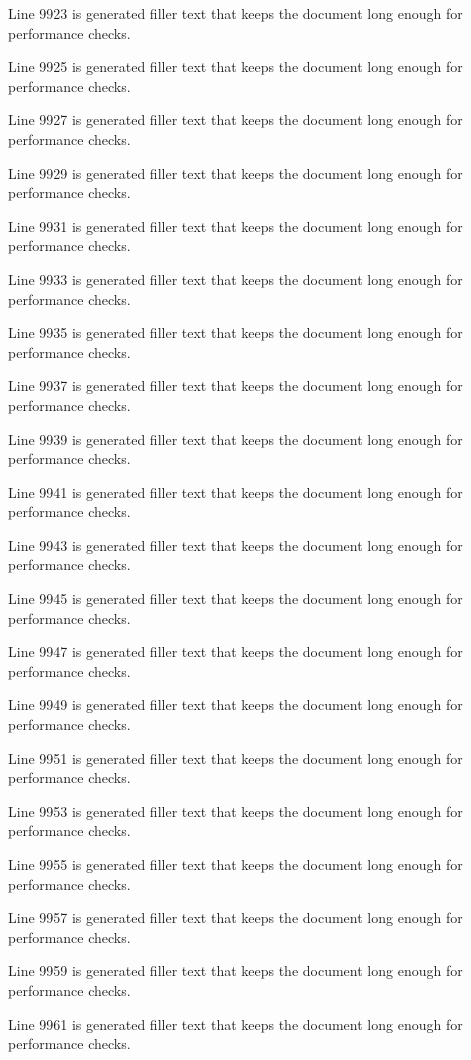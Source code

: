 Line 9923 is generated filler text that keeps the document long enough for performance checks.

Line 9925 is generated filler text that keeps the document long enough for performance checks.

Line 9927 is generated filler text that keeps the document long enough for performance checks.

Line 9929 is generated filler text that keeps the document long enough for performance checks.

Line 9931 is generated filler text that keeps the document long enough for performance checks.

Line 9933 is generated filler text that keeps the document long enough for performance checks.

Line 9935 is generated filler text that keeps the document long enough for performance checks.

Line 9937 is generated filler text that keeps the document long enough for performance checks.

Line 9939 is generated filler text that keeps the document long enough for performance checks.

Line 9941 is generated filler text that keeps the document long enough for performance checks.

Line 9943 is generated filler text that keeps the document long enough for performance checks.

Line 9945 is generated filler text that keeps the document long enough for performance checks.

Line 9947 is generated filler text that keeps the document long enough for performance checks.

Line 9949 is generated filler text that keeps the document long enough for performance checks.

Line 9951 is generated filler text that keeps the document long enough for performance checks.

Line 9953 is generated filler text that keeps the document long enough for performance checks.

Line 9955 is generated filler text that keeps the document long enough for performance checks.

Line 9957 is generated filler text that keeps the document long enough for performance checks.

Line 9959 is generated filler text that keeps the document long enough for performance checks.

Line 9961 is generated filler text that keeps the document long enough for performance checks.

